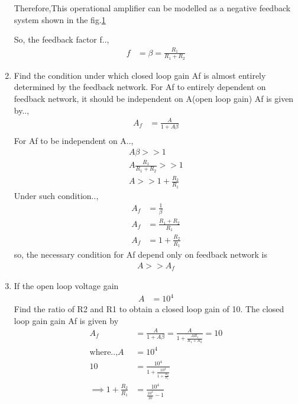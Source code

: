 \begin{enumerate}[label=\thesubsection.\arabic*.,ref=\thesubsection.\theenumi]
Therefore,This operational amplifier can be modelled as a negative feedback system shown in the fig.\ref{fig:equivalent_control_system}
\begin{figure}[!ht]
	\begin{center}
			\resizebox{\columnwidth}{!}{}
	\end{center}
\caption{}
\label{fig:equivalent_control_system}
\end{figure}
So, the feedback factor f..,
\begin{align}
     f &=\beta = \frac{R_1}{R_1+R_2}
\end{align}
\item Find the condition under which closed loop gain Af is almost entirely determined by the feedback network.
\solution For Af to entirely dependent on feedback network, it should be independent on A(open loop gain)
Af is given by..,
\begin{align}
    A_f &= \frac{A}{1+A\beta} \\
\end{align}
For Af to be independent on A..,
\begin{align}
 A\beta >> 1 \\
 A\frac{R_1}{R_1+R_2} >> 1 \\
 A >> 1 + \frac{R_2}{R_1} 
\end{align}
Under such condition..,
\begin{align}
    A_f &= \frac{1}{\beta} \\
    A_f &= \frac{R_1+R_2}{R_1}\\
    A_f &= 1+\frac{R_2}{R_1}
\end{align}
so, the necessary condition for Af depend only on feedback network is
\begin{align}
    A >> A_f
\end{align}
\item If the open loop voltage gain
\begin{align} 
A & = 10^4
\end{align}
Find the ratio of R2 and R1 to obtain a closed loop gain of 10.
\solution The closed loop gain gain Af is given by
\begin{align}
    A_f &= \frac{A}{1+A\beta}
        = \frac{A}{1+\frac{AR_1}{R_1+R_2}} = 10\\
    \text{where..,} A &= 10^4 \\
    10 &= \frac{10^4}{1+\frac{10^4}{1+\frac{R_2}{R_1}}}\\
\implies 1+\frac{R_2}{R_1} &= \frac{10^4}{\frac{10^4}{10}-1}

\end{align}
\end{enumerate}
